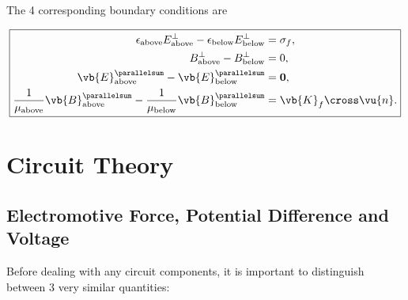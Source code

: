 \documentclass[english,a4paper,12pt]{report}
\begin{document}
The 4 corresponding boundary conditions are 

\begin{equation}
    \boxed{
    \begin{aligned}
        \epsilon _{\text{above} }E_{\text{above} }^{\perp } - \epsilon _{\text{below} }E_{\text{below} }^{\perp } &= \sigma _{f} ,\\
        B_{\text{above} }^{\perp } - B_{\text{below} }^{\perp } &=0,\\
        \vb{E} _{\text{above} }^{\parallelsum} - \vb{E} _{\text{below} }^{\parallelsum} &= \boldsymbol{0} ,\\
        \frac{1}{\mu _{\text{above} } }\vb{B} _{\text{above} }^{\parallelsum} - \frac{1}{\mu_{\text{below} } }\vb{B} _{\text{below} }^{\parallelsum} &=\vb{K} _{f}\cross \vu{n}  .                    
    \end{aligned}
    }
\end{equation}

\chapter{Circuit Theory}

\section{Electromotive Force, Potential Difference and Voltage}

Before dealing with any circuit components, it is important to distinguish between 3 very similar quantities:
\end{document}
